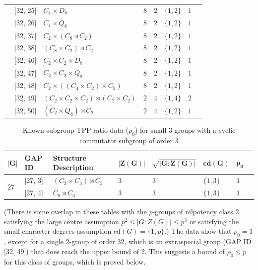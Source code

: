 \documentclass{amsart}
\theoremstyle{observation}
\theoremstyle{definition}
\theoremstyle{remark}
\numberwithin{equation}{section}
\begin{document}
\begin{table}[H]
\begin{center}
\begin{tabular}{llllllll}
          & [32, 25] & $C_4 \times D_8$ & $8$ & $2$ & $\{1, 2\}$ & $1$ \\
          & [32, 26] & $C_4 \times Q_8$ & $8$ & $2$ & $\{1, 2\}$ & $1$ \\
          & [32, 37] & $C_2 \times (C_8 \rtimes C_2)$ & $8$ & $2$ & $\{1, 2\}$ & $1$ \\
          & [32, 38] & $(C_8 \times C_2) \rtimes C_2$ & $8$ & $2$ & $\{1, 2\}$ & $1$ \\
          & [32, 46] & $C_2 \times C_2 \times D_8$ & $8$ & $2$ & $\{1, 2\}$ & $1$ \\
          & [32, 47] & $C_2 \times C_2 \times Q_8$ & $8$ & $2$ & $\{1, 2\}$ & $1$ \\
          & [32, 48] & $C_2 \times ((C_4 \times C_2) \times C_2)$ & $8$ & $2$ & $\{1, 2\}$ & $1$ \\
          & [32, 49] & $(C_2 \times C_2 \times C_2) \rtimes (C_2 \times C_2)$ & $2$ & $4$ & $\{1, 4\}$ & $2$ \\
          & [32, 50] & $(C_2 \times Q_8) \rtimes C_2$ & $2$ & $4$ & $\{1, 2\}$ & $1$ \\
    \end{tabular}
  \end{center}
\end{table}

\begin{table}[H]
  \begin{center}
    \caption{Known subgroup TPP ratio data ($\rho_0$) for small $3$-groups with a cyclic commutator subgroup of order $3$}
    \label{tbl:TblRho0GroupsOfTypeIIb}
    \begin{tabular}{llllllll}
      $\bm{|G|}$ & \multicolumn{1}{l}{\textbf{GAP ID}} & \multicolumn{1}{l}{\textbf{Structure Description}} & \multicolumn{1}{l}{$\bm{|Z(G)|}$} & \multicolumn{1}{l}{$\bm{\sqrt{|G:Z(G)|}}$} & \multicolumn{1}{l}{$\bm{\textbf{cd}(G)}$} & \multicolumn{1}{l}{$\bm{\rho_0}$} \\
      \toprule
        \multirow{2}{*}{$27$} &
            [27, 3] & $(C_3 \times C_3) \rtimes C_3$ & $3$ & $3$ & $\{1, 3\}$ & $1$ \\
          & [27, 4] & $C_9 \rtimes C_3$ & $3$ & $3$ &  $\{1, 3\}$ &$1$ \\
    \end{tabular}
  \end{center}
\end{table}

(There is some overlap in these tables with the $p$-groups of nilpotency class $2$ satisfying the large centre assumption $p^2 \leq |G:Z(G)| \leq p^3$ or satisfying the small character degrees assumption $\text{cd}(G) = \{1, p\}$.) The data show that $\rho_0 = 1$, except for a single $2$-group of order $32$, which is an extraspecial group (GAP ID [32, 49]) that does reach the upper bound of $2$. This suggests a bound of $\rho_0 \leq p$ for this class of groups, which is proved below.
\end{document}
